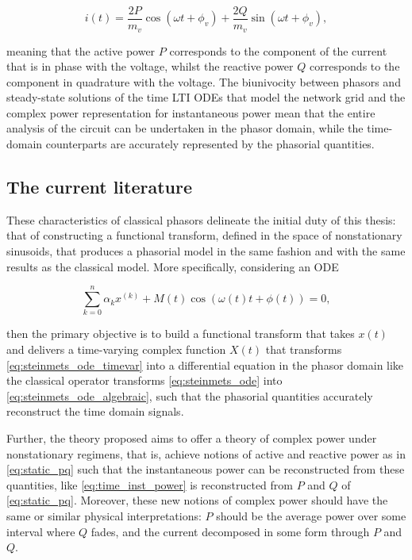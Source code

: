 \begin{equation} i(t) = \dfrac{2 P}{m_v} \cos\left(\omega t + \phi_v \right) + \dfrac{2 Q}{m_v}\sin\left(\omega t + \phi_v\right), \label{eq:active_reactive_current} \end{equation}

	\noindent meaning that the active power $P$ corresponds to the component of the current that is in phase with the voltage, whilst the reactive power $Q$ corresponds to the component in quadrature with the voltage. The biunivocity between phasors and steady-state solutions of the time LTI ODEs that model the network grid and the complex power representation for instantaneous power mean that the entire analysis of the circuit can be undertaken in the phasor domain, while the time-domain counterparts are accurately represented by the phasorial quantities.

\subsection{The current literature}\label{subsec:currentlit}

	These characteristics of classical phasors delineate the initial duty of this thesis: that of constructing a functional transform, defined in the space of nonstationary sinusoids, that produces a phasorial model in the same fashion and with the same results as the classical model. More specifically, considering an ODE

\begin{equation} \sum_{k=0}^n \alpha_k x^{(k)} + M(t)\cos\left(\omega(t) t + \phi(t)\right) = 0, \label{eq:steinmets_ode_timevar} \end{equation}

	\noindent then the primary objective is to build a functional transform that takes $x(t)$ and delivers a time-varying complex function $X(t)$ that transforms \eqref{eq:steinmets_ode_timevar} into a differential equation in the phasor domain like the classical operator transforms \eqref{eq:steinmets_ode} into \eqref{eq:steinmets_ode_algebraic}, such that the phasorial quantities accurately reconstruct the time domain signals. 

	Further, the theory proposed aims to offer a theory of complex power under nonstationary regimens, that is, achieve notions of active and reactive power as in \eqref{eq:static_pq} such that the instantaneous power can be reconstructed from these quantities, like \eqref{eq:time_inst_power} is reconstructed from $P$ and $Q$ of \eqref{eq:static_pq}. Moreover, these new notions of complex power should have the same or similar physical interpretations: $P$ should be the average power over some interval where $Q$ fades, and the current decomposed in some form through $P$ and $Q$.

